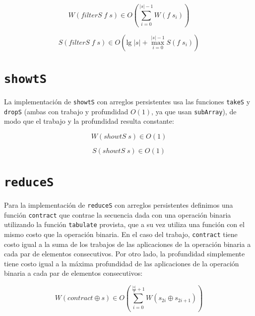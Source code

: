 \documentclass[a4paper,10pt]{article}
\begin{document}
\begin{equation*}
    W \left( filterS \; f \; s \right) \in
    O \left( \sum_{i=0}^{\vert s \vert -1} W(f \; s_i) \right)
\end{equation*}

\begin{equation*}
    S \left( filterS \; f \; s \right) \in
    O \left( \text{lg} \; \vert s \vert + \max_{i=0}^{\vert s \vert -1} S(f \; s_i) \right)
\end{equation*}


\section*{\texttt{showtS}}

La implementación de \texttt{showtS} con arreglos persistentes usa las funciones
\texttt{takeS} y \texttt{dropS} (ambas con trabajo y profundidad $O \left( 1 \right)$,
ya que usan \texttt{subArray}), de modo que el trabajo y la profundidad resulta
constante:

\begin{equation*}
    W \left( showtS \; s \right) \in
    O \left( 1 \right)
\end{equation*}

\begin{equation*}
    S \left( showtS \; s \right) \in
    O \left( 1 \right)
\end{equation*}


\section*{\texttt{reduceS}}

Para la implementación de \texttt{reduceS} con arreglos persistentes definimos
una función \texttt{contract} que contrae la secuencia dada con una operación
binaria utilizando la función \texttt{tabulate} provista, que a su vez utiliza
una función con el mismo costo que la operación binaria. En el caso del trabajo,
\texttt{contract} tiene costo igual a la suma de los trabajos de las aplicaciones
de la operación binaria a cada par de elementos consecutivos. Por otro lado,
la profundidad simplemente tiene costo igual a la máxima profundidad de las
aplicaciones de la operación binaria a cada par de elementos consecutivos:

\begin{equation*}
    W \left( contract \oplus s \right) \in
    O \left( \sum_{i=0}^{\frac{\vert s \vert}{2} + 1} W \left( s_{2i} \oplus s_{2i+1} \right) \right)
\end{equation*}
\end{document}
